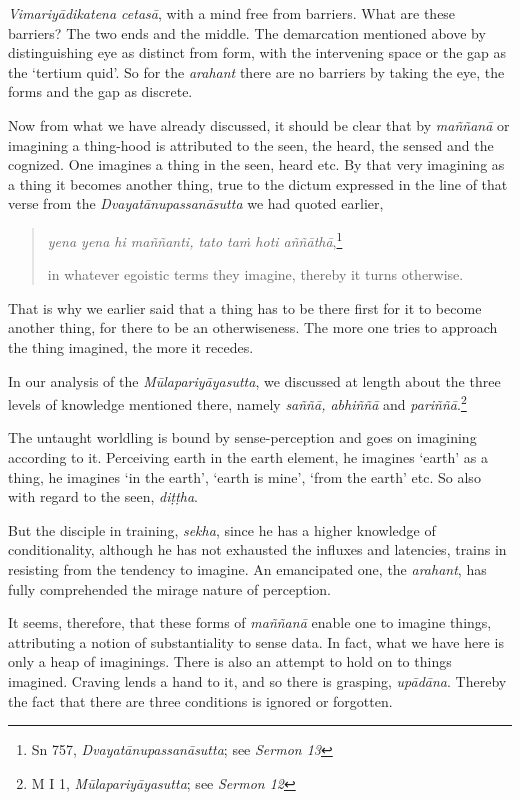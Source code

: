 \emph{Vimariyādikatena cetasā}, with a mind free from barriers. What are these barriers? The two ends and the middle. The demarcation mentioned above by distinguishing eye as distinct from form, with the intervening space or the gap as the `tertium quid'. So for the \emph{arahant} there are no barriers by taking the eye, the forms and the gap as discrete.

Now from what we have already discussed, it should be clear that by \emph{maññanā} or imagining a thing-hood is attributed to the seen, the heard, the sensed and the cognized. One imagines a thing in the seen, heard etc. By that very imagining as a thing it becomes another thing, true to the dictum expressed in the line of that verse from the \emph{Dvayatānupassanāsutta} we had quoted earlier,

\begin{quote}
\emph{yena yena hi maññanti, tato taṁ hoti aññāthā},\footnote{Sn 757, \emph{Dvayatānupassanāsutta}; see \emph{Sermon 13}}

in whatever egoistic terms they imagine, thereby it turns otherwise.
\end{quote}

That is why we earlier said that a thing has to be there first for it to become another thing, for there to be an otherwiseness. The more one tries to approach the thing imagined, the more it recedes.

In our analysis of the \emph{Mūlapariyāyasutta}, we discussed at length about the three levels of knowledge mentioned there, namely \emph{saññā, abhiññā} and \emph{pariññā}.\footnote{M I 1, \emph{Mūlapariyāyasutta}; see \emph{Sermon 12}}

The untaught worldling is bound by sense-perception and goes on imagining according to it. Perceiving earth in the earth element, he imagines `earth' as a thing, he imagines `in the earth', `earth is mine', `from the earth' etc. So also with regard to the seen, \emph{diṭṭha}.

But the disciple in training, \emph{sekha}, since he has a higher knowledge of conditionality, although he has not exhausted the influxes and latencies, trains in resisting from the tendency to imagine. An emancipated one, the \emph{arahant}, has fully comprehended the mirage nature of perception.

It seems, therefore, that these forms of \emph{maññanā} enable one to imagine things, attributing a notion of substantiality to sense data. In fact, what we have here is only a heap of imaginings. There is also an attempt to hold on to things imagined. Craving lends a hand to it, and so there is grasping, \emph{upādāna}. Thereby the fact that there are three conditions is ignored or forgotten.

